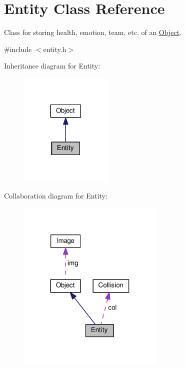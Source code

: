 \hypertarget{classEntity}{}\section{Entity Class Reference}
\label{classEntity}


Class for storing health, emotion, team, etc. of an \hyperlink{classObject}{Object}.  




{\ttfamily \#include $<$entity.\+h$>$}



Inheritance diagram for Entity\+:\nopagebreak
\begin{figure}[H]
\begin{center}
\leavevmode
\includegraphics[width=125pt]{classEntity__inherit__graph}
\end{center}
\end{figure}


Collaboration diagram for Entity\+:\nopagebreak
\begin{figure}[H]
\begin{center}
\leavevmode
\includegraphics[width=198pt]{classEntity__coll__graph}
\end{center}
\end{figure}
